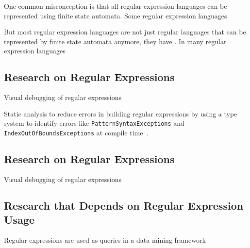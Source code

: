 One common misconception is that all regular expression languages can be represented using finite state automata.  Some regular expression languages

But most regular expression languages are not just regular languages that can be represented by finite state automata anymore, they have .  In many regular expression languages





\subsection{Research on Regular Expressions}
Visual debugging of regular expressions~\cite{Beck:2014:RVD:2591062.2591111}

Static analysis to reduce errors in building regular expressions by using a type system to identify errors like {\tt PatternSyntaxExceptions} and {\tt IndexOutOfBoundsExceptions} at compile time~\cite{Spishak:2012:TSR:2318202.2318207}.

\subsection{Research on Regular Expressions}
Visual debugging of regular expressions~\cite{Beck:2014:RVD:2591062.2591111}

\subsection{Research that Depends on Regular Expression Usage}
Regular expressions are used as queries in a data mining framework~\cite{Begel:2010:CDE:1806799.1806821}

